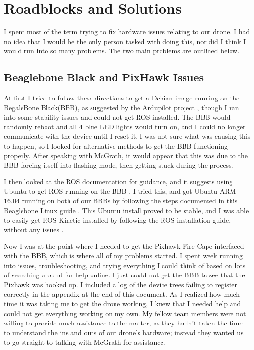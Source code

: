 \documentclass[IEEEtran,letterpaper,10pt,notitlepage,draftclsnofoot,onecolumn]{article}
\begin{document}
\section{Roadblocks and Solutions}
I spent most of the term trying to fix hardware issues relating to our drone. I had no idea that I would be the only person tasked with doing this, nor did I think I would run into so many problems. The two main problems are outlined below.

  \subsection{Beaglebone Black and PixHawk Issues}
  At first I tried to follow these directions to get a Debian image running on the BegaleBone Black(BBB),
  as suggested by the Ardupilot project \cite{BBBNix},
  though I ran into some stability issues and could not get ROS installed. The BBB would randomly reboot and
  all 4 blue LED lights would turn on, and I could no longer communicate with the device until I reset it.
  I was not sure what was causing this to happen, so I looked for alternative methods to get the BBB
  functioning properly. After speaking with McGrath, it would appear that this was due to the BBB forcing itself into flashing mode, then getting stuck during the process.

  I then looked at the ROS documentation for guidance, and it suggests using Ubuntu to get ROS running on
  the BBB \cite{ROSBBB}. I tried this, and got Ubuntu ARM 16.04 running on both of our
  BBBs by following the steps documented in this Beaglebone Linux guide \cite{ELINUX}. This Ubuntu install proved to be stable, and I was able to easily get ROS Kinetic installed by following
  the ROS installation guide, without any issues \cite{ROSINSTALL}.

  Now I was at the point where I needed to get the Pixhawk Fire Cape interfaced with the BBB, which is where
  all of my problems started. I spent week running into issues, troubleshooting, and trying everything I could think of based on lots of searching around for help online. I just could not get the BBB to see that
  the Pixhawk was hooked up. I included a log of the device trees failing to register correctly in the appendix at the end of this document. As I realized how much time it was taking me to get the drone working, I knew that I needed help and could not get everything working on my own. My fellow team members
  were not willing to provide much assistance to the matter, as they hadn't taken the time to understand the ins and outs of our drone's hardware; instead they wanted us to go straight to talking with McGrath for assistance.
\end{document}
